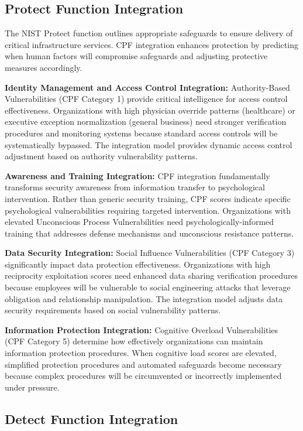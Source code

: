 \documentclass[10pt, twocolumn]{article}
\begin{document}
\subsection{Protect Function Integration}

The NIST Protect function outlines appropriate safeguards to ensure delivery of critical infrastructure services. CPF integration enhances protection by predicting when human factors will compromise safeguards and adjusting protective measures accordingly.

\textbf{Identity Management and Access Control Integration:} Authority-Based Vulnerabilities (CPF Category 1) provide critical intelligence for access control effectiveness. Organizations with high physician override patterns (healthcare) or executive exception normalization (general business) need stronger verification procedures and monitoring systems because standard access controls will be systematically bypassed. The integration model provides dynamic access control adjustment based on authority vulnerability patterns.

\textbf{Awareness and Training Integration:} CPF integration fundamentally transforms security awareness from information transfer to psychological intervention. Rather than generic security training, CPF scores indicate specific psychological vulnerabilities requiring targeted intervention. Organizations with elevated Unconscious Process Vulnerabilities need psychologically-informed training that addresses defense mechanisms and unconscious resistance patterns.

\textbf{Data Security Integration:} Social Influence Vulnerabilities (CPF Category 3) significantly impact data protection effectiveness. Organizations with high reciprocity exploitation scores need enhanced data sharing verification procedures because employees will be vulnerable to social engineering attacks that leverage obligation and relationship manipulation. The integration model adjusts data security requirements based on social vulnerability patterns.

\textbf{Information Protection Integration:} Cognitive Overload Vulnerabilities (CPF Category 5) determine how effectively organizations can maintain information protection procedures. When cognitive load scores are elevated, simplified protection procedures and automated safeguards become necessary because complex procedures will be circumvented or incorrectly implemented under pressure.

\subsection{Detect Function Integration}
\end{document}
